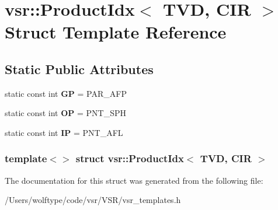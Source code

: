 \hypertarget{structvsr_1_1_product_idx_3_01_t_v_d_00_01_c_i_r_01_4}{\section{vsr\-:\-:Product\-Idx$<$ T\-V\-D, C\-I\-R $>$ Struct Template Reference}
\label{structvsr_1_1_product_idx_3_01_t_v_d_00_01_c_i_r_01_4}
}
\subsection*{Static Public Attributes}
\begin{DoxyCompactItemize}
\item 
\hypertarget{structvsr_1_1_product_idx_3_01_t_v_d_00_01_c_i_r_01_4_ac84895fdeb2bd9af749a1a89871c8887}{static const int {\bfseries G\-P} = P\-A\-R\-\_\-\-A\-F\-P}\label{structvsr_1_1_product_idx_3_01_t_v_d_00_01_c_i_r_01_4_ac84895fdeb2bd9af749a1a89871c8887}

\item 
\hypertarget{structvsr_1_1_product_idx_3_01_t_v_d_00_01_c_i_r_01_4_a0de7bea0397150cecfc0cbec4a1c5214}{static const int {\bfseries O\-P} = P\-N\-T\-\_\-\-S\-P\-H}\label{structvsr_1_1_product_idx_3_01_t_v_d_00_01_c_i_r_01_4_a0de7bea0397150cecfc0cbec4a1c5214}

\item 
\hypertarget{structvsr_1_1_product_idx_3_01_t_v_d_00_01_c_i_r_01_4_aba89800c6fea201fb63eb47d6a329e60}{static const int {\bfseries I\-P} = P\-N\-T\-\_\-\-A\-F\-L}\label{structvsr_1_1_product_idx_3_01_t_v_d_00_01_c_i_r_01_4_aba89800c6fea201fb63eb47d6a329e60}

\end{DoxyCompactItemize}
\subsubsection*{template$<$$>$ struct vsr\-::\-Product\-Idx$<$ T\-V\-D, C\-I\-R $>$}



The documentation for this struct was generated from the following file\-:\begin{DoxyCompactItemize}
\item 
/\-Users/wolftype/code/vsr/\-V\-S\-R/vsr\-\_\-templates.\-h\end{DoxyCompactItemize}

